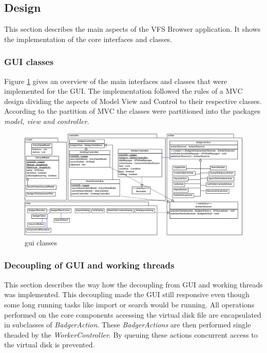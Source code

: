 \subsection{Design}
This section describes the main aspects of the VFS Browser application. It shows
the implementation of the core interfaces and classes.

\subsubsection{GUI classes}\label{sec:guiClasses}
Figure \ref{fig:gui_classes} gives an overview of the main interfaces and
classes that were implemented for the GUI. The implementation followed the rules
of a MVC design dividing the aspects of Model View and Control to their
respective classes. According to the partition of MVC the classes were
partitioned into the packages \textit{model, view and controller}.

\begin{figure}[h!]
\centering
\includegraphics[width=1\textwidth]{figures/gui_classes.eps}
\caption{gui classes}
\label{fig:gui_classes}
\end{figure}


\subsubsection{Decoupling of GUI and working threads}
This section describes the way how the decoupling from GUI and working threads
was implemented. This decoupling made the GUI still responsive even though some
long running tasks like import or search would be running. All operations performed on the core components accessing the virtual disk file are encapsulated in subclasses of \textit{BadgerAction}. These \textit{BadgerActions} are then performed single theaded by the \textit{WorkerController}. By queuing these actions concurrent access to the virtual disk is prevented.

